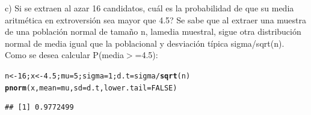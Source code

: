 \documentclass[12pt,letterpaper]{article}\usepackage[]{graphicx}\usepackage[]{color}
\makeatletter
\newcommand{\hlnum}[1]{\textcolor[rgb]{0.686,0.059,0.569}{#1}}%
\newcommand{\hlopt}[1]{\textcolor[rgb]{0,0,0}{#1}}%
\newcommand{\hlstd}[1]{\textcolor[rgb]{0.345,0.345,0.345}{#1}}%
\newcommand{\hlkwb}[1]{\textcolor[rgb]{0.69,0.353,0.396}{#1}}%
\newcommand{\hlkwc}[1]{\textcolor[rgb]{0.333,0.667,0.333}{#1}}%
\newcommand{\hlkwd}[1]{\textcolor[rgb]{0.737,0.353,0.396}{\textbf{#1}}}%
\newenvironment{kframe}{%
 \def\at@end@of@kframe{}%
 \ifinner\ifhmode%
  \def\at@end@of@kframe{\end{minipage}}%
  \begin{minipage}{\columnwidth}%
 \fi\fi%
 \def\FrameCommand##1{\hskip\@totalleftmargin \hskip-\fboxsep
 \colorbox{shadecolor}{##1}\hskip-\fboxsep
     \hskip-\linewidth \hskip-\@totalleftmargin \hskip\columnwidth}%
 \MakeFramed {\advance\hsize-\width
   \@totalleftmargin\z@ \linewidth\hsize
   \@setminipage}}%
 {\par\unskip\endMakeFramed%
 \at@end@of@kframe}
\newenvironment{knitrout}{}{} %
\makeatother
\begin{document}
\begin{description}
  \item c) Si se extraen al azar 16 candidatos, cu\'al es la probabilidad de que su media aritm\'etica en extroversi\'on sea mayor que 4.5? 
Se sabe que al extraer una muestra de una poblaci\'on normal de tama\~no n, lamedia muestral, sigue otra distribuci\'on normal de media igual que la poblacional y desviaci\'on t\'ipica sigma/sqrt(n).\\

Como se desea calcular P(media$>$=4.5):
\begin{knitrout}
\color{fgcolor}\begin{kframe}
\begin{alltt}
\hlstd{n} \hlkwb{<-} \hlnum{16}\hlstd{; x} \hlkwb{<-} \hlnum{4.5}\hlstd{; mu}\hlkwb{=}\hlnum{5}\hlstd{; sigma}\hlkwb{=}\hlnum{1}\hlstd{; d.t}\hlkwb{=}\hlstd{sigma}\hlopt{/}\hlkwd{sqrt}\hlstd{(n)}
\hlkwd{pnorm}\hlstd{(x,} \hlkwc{mean}\hlstd{=mu,} \hlkwc{sd}\hlstd{=d.t,} \hlkwc{lower.tail}\hlstd{=}\hlnum{FALSE}\hlstd{)}
\end{alltt}
\begin{verbatim}
## [1] 0.9772499
\end{verbatim}
\end{kframe}
\end{knitrout}
\end{description}
\end{document}
